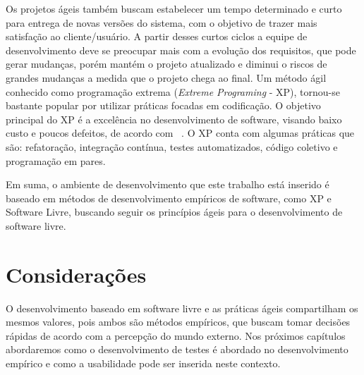 Os projetos ágeis também buscam estabelecer um tempo determinado e curto para entrega de novas versões do sistema, com o objetivo de trazer mais satisfação ao cliente/usuário.
%
A partir desses curtos ciclos a equipe de desenvolvimento 
deve se preocupar mais com a evolução dos requisitos, que pode gerar mudanças, porém 
mantém o projeto atualizado e diminui o riscos de grandes mudanças a medida que o 
projeto chega ao final.
%
Um método ágil conhecido como programação extrema (\emph{Extreme Programing} - XP), 
tornou-se bastante popular por utilizar práticas focadas em codificação.
%
O objetivo principal do XP é a excelência no desenvolvimento de software, visando baixo custo e poucos defeitos, de acordo com ~. O XP conta com algumas práticas que são: refatoração, integração contínua, testes automatizados, código coletivo e programação em pares.

Em suma, o ambiente de desenvolvimento que este trabalho está inserido é baseado em métodos de desenvolvimento empíricos de software, como XP e Software Livre, buscando seguir os princípios ágeis para o desenvolvimento de software livre.

\section{Considerações}

O desenvolvimento baseado em software livre e as práticas ágeis compartilham os mesmos valores, pois ambos são métodos empíricos, que buscam tomar decisões rápidas de acordo com a percepção do mundo externo. Nos próximos capítulos abordaremos como o desenvolvimento de testes é abordado no desenvolvimento empírico e como a usabilidade pode ser inserida neste contexto.
